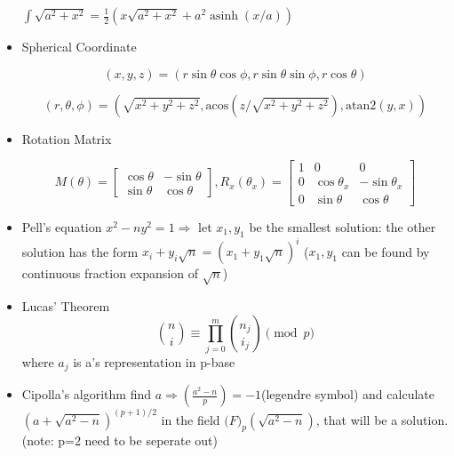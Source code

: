 \begin{itemize}
{  \(
    \displaystyle
    \int \sqrt{a^2 + x^2} = \frac{1}{2} \left(x\sqrt{a^2+x^2} + a^2 \operatorname{asinh}(x/a) \right)
  \)
}

\item Spherical Coordinate

$$
(x, y, z) = (r\sin\theta\cos\phi, r\sin\theta\sin\phi, r\cos\theta) 
$$

$$
(r, \theta, \phi) = (\sqrt{x^2+y^2+z^2}, \textrm{acos}(z/\sqrt{x^2+y^2+z^2}), \textrm{atan2}(y,x)) 
$$

\item Rotation Matrix

$$
M(\theta)=
\begin{bmatrix}
\cos\theta & -\sin\theta\\
\sin\theta & \cos\theta
\end{bmatrix},
R_x(\theta_x)=
\begin{bmatrix}
1 & 0 & 0\\
0 & \cos\theta_x & -\sin\theta_x \\
0 & \sin\theta & \cos\theta
\end{bmatrix}
$$

\item Pell's equation
$x^2-ny^2=1 \Rightarrow $ let $x_1,y_1$ be the smallest solution:
the other solution has the form $x_i+y_i\sqrt{n}=(x_1+y_1\sqrt{n})^i$
($x_1,y_1$ can be found by continuous fraction expansion of $\sqrt{n}$)

\item Lucas' Theorem
$$ 
\binom{n}{i}\equiv \prod_{j=0}^{m}\binom{n_j}{i_j}\pmod{p}
$$
where $a_j$ is a's representation in p-base


\item Cipolla's algorithm
	find $a\Rightarrow (\frac{a^2-n}{p})=-1$(legendre symbol) and calculate $(a+\sqrt{a^2-n})^{(p+1)/2}$ in the field $\mathbb(F)_p(\sqrt{a^2-n})$, that will be a solution.(note: p=2 need to be seperate out)
\end{itemize}

